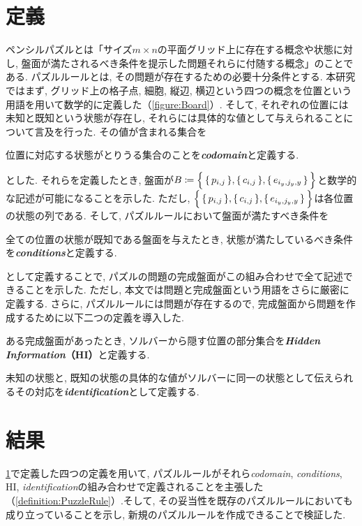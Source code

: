 \section{定義}\label{section:IntroDefinition}
ペンシルパズルとは「サイズ$m\times n$の平面グリッド上に存在する概念や状態に対し, 盤面が満たされるべき条件を提示した問題それらに付随する概念」のことである. パズルルールとは, その問題が存在するための必要十分条件とする. 本研究ではまず, グリッド上の格子点, 細胞, 縦辺, 横辺という四つの概念を位置という用語を用いて数学的に定義した（\cref{figure:Board}）. そして, それぞれの位置には未知と既知という状態が存在し, それらには具体的な値として与えられることについて言及を行った. その値が含まれる集合を
\begin{definition}
	位置に対応する状態がとりうる集合のことを\textbf{\textit{codomain}}と定義する.
\end{definition}
とした. それらを定義したとき, 盤面が$B\coloneqq\Bigl\{\,\{\,p_{i,j}\,\},\{\,c_{i,j}\,\},\{\,e_{i_y,j_y,y}\,\}\,\Bigr\}$と数学的な記述が可能になることを示した.  ただし, $\Bigl\{\,\{\,p_{i,j}\,\},\{\,c_{i,j}\,\},\{\,e_{i_y,j_y,y}\,\}\,\Bigr\}$は各位置の状態の列である. そして, パズルルールにおいて盤面が満たすべき条件を
\begin{definition}
	全ての位置の状態が既知である盤面を与えたとき, 状態が満たしているべき条件を\textbf{\textit{conditions}}と定義する.
\end{definition}
として定義することで, パズルの問題の完成盤面がこの組み合わせで全て記述できることを示した. ただし, 本文では問題と完成盤面という用語をさらに厳密に定義する. さらに, パズルルールには問題が存在するので, 完成盤面から問題を作成するために以下二つの定義を導入した.
\begin{definition}
	ある完成盤面があったとき, ソルバーから隠す位置の部分集合を\textbf{\textit{Hidden Information}（HI）}と定義する.
\end{definition}
\begin{definition}
	未知の状態と, 既知の状態の具体的な値がソルバーに同一の状態として伝えられるその対応を\textbf{\textit{identification}}として定義する.
\end{definition}

\section{結果}
\cref{section:IntroDefinition}で定義した四つの定義を用いて, パズルルールがそれら\textit{codomain}, \textit{conditions}, HI, \textit{identification}の組み合わせで定義されることを主張した（\cref{definition:PuzzleRule}）.そして, その妥当性を既存のパズルルールにおいても成り立っていることを示し, 新規のパズルルールを作成できることで検証した.
